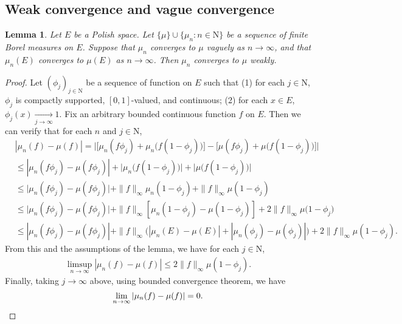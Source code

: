 \documentclass[12pt,a4paper]{amsart}
\numberwithin{equation}{section}
\theoremstyle{plain}
\newtheorem{lem}[thm]{Lemma}
\theoremstyle{definition}
\theoremstyle{remark}
\begin{document}
\subsection{Weak convergence and vague convergence}
\begin{lem} \label{thm:A.1}
	Let $E$ be a Polish space.
	Let $\{\mu\}\cup\{\mu_n:n\in \mathrm N\}$ be a sequence of finite Borel measures on $E$.
	Suppose that $\mu_n$ converges to $\mu$ vaguely as $n\to \infty$, and that $\mu_n(E)$ converges to $\mu(E)$ as $n\to \infty$.
	Then $\mu_n$ converges to $\mu$ weakly.
\end{lem}
\begin{proof}
	Let $(\phi_j)_{j\in \mathrm N}$ be a sequence of function on $E$ such that
	(1) for each $j\in \mathrm N$, $\phi_j$ is compactly supported, $[0,1]$-valued, and continuous;
	(2) for each $x\in E$, $\phi_j(x)\xrightarrow[j\to \infty]{} 1$.
	Fix an arbitrary bounded continuous function $f$ on $E$.
	Then we can verify that for each $n$ and $j\in \mathrm N$,
 \begin{align}
 	&  |\mu_n(f) -\mu(f)|
 	= \big|\big[\mu_n(f\phi_j) + \mu_n\big(f(1-\phi_j)\big) \big]- \big[\mu(f\phi_j) + \mu\big(f(1-\phi_j)\big)\big]\big|
 	\\&\leq|\mu_n(f\phi_j) - \mu(f\phi_j)| + \big|\mu_n\big(f(1-\phi_j)\big)\big| + \big|\mu\big(f(1-\phi_j)\big)\big|
 	\\&\leq \big|\mu_n(f\phi_j) - \mu(f\phi_j)\big| + \|f\|_\infty \mu_n(1-\phi_j) + \|f\|_\infty\mu(1-\phi_j)
 	\\&\leq \big|\mu_n(f\phi_j) - \mu(f\phi_j)\big| + \|f\|_\infty [\mu_n(1-\phi_j)-\mu(1-\phi_j)] + 2\|f\|_\infty\mu\big(1-\phi_j\big)
 	\\&\leq |\mu_n(f\phi_j)-\mu(f\phi_j)| + \|f\|_\infty \big(|\mu_n(E)- \mu(E)| + |\mu_n(\phi_j)-\mu(\phi_j)|\big) + 2\|f\|_\infty \mu(1-\phi_j).
 \end{align}
 From this and the assumptions of the lemma, we have for each $j\in \mathrm N$,
 \begin{align}
 	\limsup_{n\to \infty} |\mu_n(f) - \mu(f)| \leq 2\|f\|_\infty \mu(1-\phi_j).
 \end{align}
 Finally, taking $j \to \infty$ above, using bounded convergence theorem, we have
 \[
 \lim_{n\to \infty} |\mu_n(f)-\mu(f)| = 0. \qedhere
 \]
\end{proof}
\end{document}

